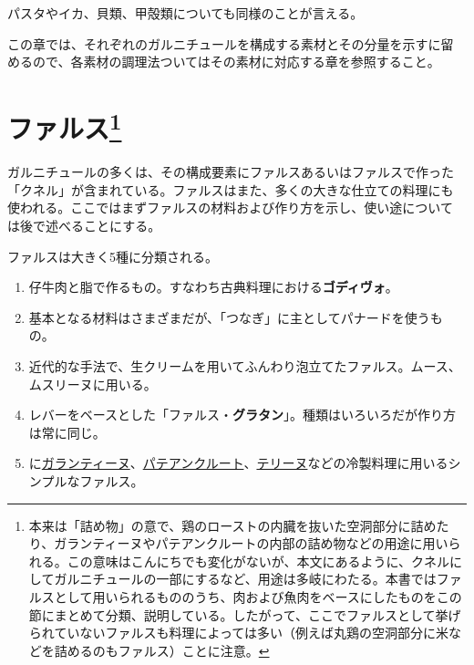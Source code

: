 パスタやイカ、貝類、甲殻類についても同様のことが言える。

この章では、それぞれのガルニチュールを構成する素材とその分量を示すに留
めるので、各素材の調理法ついてはその素材に対応する章を参照すること。

\hypertarget{serie-des-farces-diverses}{%
\section[ファルス]{\texorpdfstring{ファルス\footnote{本来は「詰め物」の意で、鶏のローストの内臓を抜いた空洞部分に詰めたり、ガランティーヌやパテアンクルートの内部の詰め物などの用途に用いられる。この意味はこんにちでも変化がないが、本文にあるように、クネルにしてガルニチュールの一部にするなど、用途は多岐にわたる。本書ではファルスとして用いられるもののうち、肉および魚肉をベースにしたものをこの節にまとめて分類、説明している。したがって、ここでファルスとして挙げられていないファルスも料理によっては多い（例えば丸鶏の空洞部分に米などを詰めるのもファルス）ことに注意。}}{ファルス}}\label{serie-des-farces-diverses}}


 

ガルニチュールの多くは、その構成要素にファルスあるいはファルスで作った
「クネル」が含まれている。ファルスはまた、多くの大きな仕立ての料理にも
使われる。ここではまずファルスの材料および作り方を示し、使い途について
は後で述べることにする。

ファルスは大きく5種に分類される。

\begin{enumerate}
\def\labelenumi{\arabic{enumi}.}
\item
  仔牛肉と脂で作るもの。すなわち古典料理における\textbf{ゴディヴォ}。
\item
  基本となる材料はさまざまだが、「つなぎ」に主としてパナードを使うもの。
\item
  近代的な手法で、生クリームを用いてふんわり泡立てたファルス。ムース、ムスリーヌに用いる。
\item
  レバーをベースとした「ファルス・\textbf{グラタン}」。種類はいろいろだが作り方は常に同じ。
\item
  に\protect\hyperlink{}{ガランティーヌ}、\protect\hyperlink{}{パテアンクルート}、\protect\hyperlink{}{テリーヌ}などの冷製料理に用いるシンプルなファルス。
\end{enumerate}


